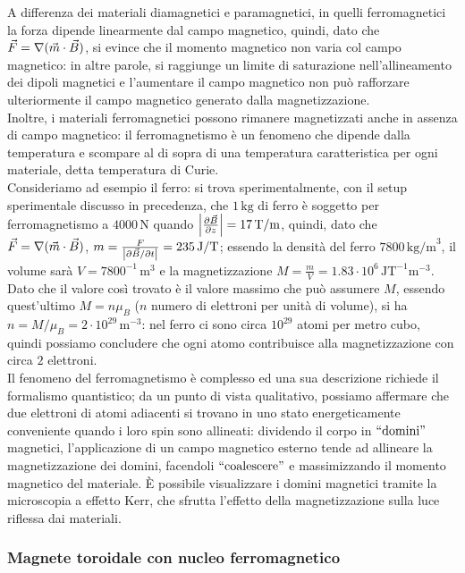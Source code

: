\documentclass[]{article}
\begin{document}
A differenza dei materiali diamagnetici e paramagnetici, in quelli ferromagnetici la forza dipende linearmente dal campo magnetico, quindi, dato che $ \vec{F} = \nabla(\vec{m}\cdot\vec{B}) $, si evince che il momento magnetico non varia col campo magnetico: in altre parole, si raggiunge un limite di saturazione nell'allineamento dei dipoli magnetici e l'aumentare il campo magnetico non può rafforzare ulteriormente il campo magnetico generato dalla magnetizzazione. \\ 
%
Inoltre, i materiali ferromagnetici possono rimanere magnetizzati anche in assenza di campo magnetico: il ferromagnetismo è un fenomeno che dipende dalla temperatura e scompare al di sopra di una temperatura caratteristica per ogni materiale, detta temperatura di Curie. \\ 
%
Consideriamo ad esempio il ferro: si trova sperimentalmente, con il setup sperimentale discusso in precedenza, che $ 1\,\text{kg} $ di ferro è soggetto per ferromagnetismo a $ 4000\,\text{N} $ quando $ \left\lvert\frac{\partial\vec{B}}{\partial z}\right\rvert = 17\,\text{T/m} $, quindi, dato che $ \vec{F} = \nabla(\vec{m}\cdot\vec{B}) $, $ m = \frac{F}{\left\lvert\partial\vec{B} / \partial t\right\rvert} = 235 \,\text{J/T} $; essendo la densità del ferro $ 7800 \,\text{kg/m}^3 $, il volume sarà $ V = 7800^{-1} \,\text{m}^3 $ e la magnetizzazione $ M = \frac{m}{V} = 1.83 \cdot 10^6 \,\text{JT}^{-1}\text{m}^{-3} $. Dato che il valore così trovato è il valore massimo che può assumere $ M $, essendo quest'ultimo $ M = n\mu_B $ ($ n $ numero di elettroni per unità di volume), si ha $ n = M / \mu_B = 2\cdot 10^{29} \,\text{m}^{-3} $: nel ferro ci sono circa $ 10^{29} $ atomi per metro cubo, quindi possiamo concludere che ogni atomo contribuisce alla magnetizzazione con circa $ 2 $ elettroni. \\ 
%
Il fenomeno del ferromagnetismo è complesso ed una sua descrizione richiede il formalismo quantistico; da un punto di vista qualitativo, possiamo affermare che due elettroni di atomi adiacenti si trovano in uno stato energeticamente conveniente quando i loro spin sono allineati: dividendo il corpo in $ ``\text{domini}" $ magnetici, l'applicazione di un campo magnetico esterno tende ad allineare la magnetizzazione dei domini, facendoli $ ``\text{coalescere}" $ e massimizzando il momento magnetico del materiale. È possibile visualizzare i domini magnetici tramite la microscopia a effetto Kerr, che sfrutta l'effetto della magnetizzazione sulla luce riflessa dai materiali.

\subsubsection{Magnete toroidale con nucleo ferromagnetico}
\end{document}
